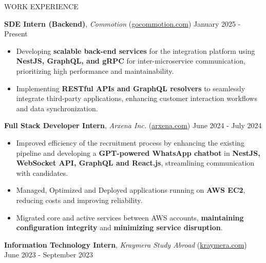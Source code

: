 \documentclass{resume} %
\begin{document}
\begin{rSection}{WORK EXPERIENCE}

    \textbf{SDE Intern (Backend)}, \textit{Commotion} (\href{https://gocommotion.com}{gocommotion.com})  \hfill January 2025 - Present

    \begin{itemize}
        \itemsep -6pt {}
            \item Developing \textbf{scalable back-end services} for the integration platform using \textbf{NestJS, GraphQL, and gRPC} for inter-microservice communication, prioritizing high performance and maintainability.
            \item Implementing \textbf{RESTful APIs and GraphQL resolvers} to seamlessly integrate third-party applications, enhancing customer interaction workflows and data synchronization.
    \end{itemize}

    \textbf{Full Stack Developer Intern}, \textit{Arxena Inc.} (\href{https://arxena.com}{arxena.com})  \hfill June 2024 - July 2024

    \begin{itemize}
        \itemsep -6pt {}
        \item Improved efficiency of the recruitment process by enhancing the existing
              pipeline and developing a \textbf{GPT-powered WhatsApp chatbot} in
              \textbf{NestJS, WebSocket API, GraphQL and React.js}, streamlining
              communication with candidates.
        \item  Managed, Optimized and Deployed applications running on \textbf{AWS EC2},
              reducing costs and improving reliability.
              \item Migrated core and active services between AWS accounts, \textbf{maintaining configuration integrity} and \textbf{minimizing service disruption}.
    \end{itemize}

    \textbf{Information Technology Intern}, \textit{Kraymera Study Abroad} (\href{https://kraymera.com}{kraymera.com})  \hfill June 2023 - September 2023

    \begin{itemize}
        \itemsep -6pt {}
        

\end{itemize}
\end{rSection}
\end{document}
